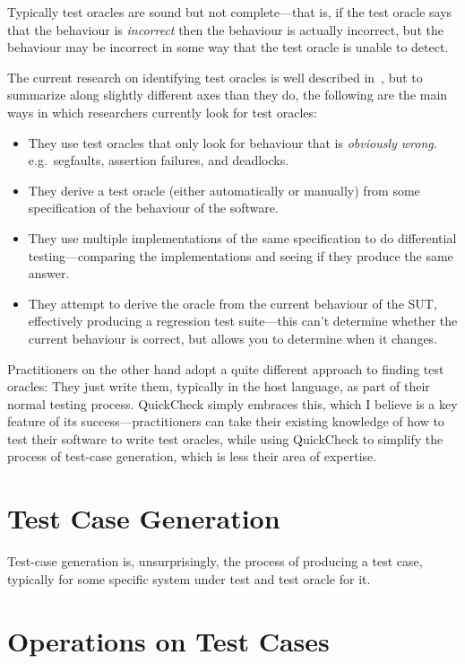 Typically test oracles are sound but not complete---that is,
if the test oracle says that the behaviour is \emph{incorrect} then the behaviour is actually incorrect,
but the behaviour may be incorrect in some way that the test oracle is unable to detect.

The current research on identifying test oracles is well described in~\cite{DBLP:journals/tse/BarrHMSY15},
but to summarize along slightly different axes than they do,
the following are the main ways in which researchers currently look for test oracles:

\begin{itemize}
\item They use test oracles that only look for behaviour that is \emph{obviously wrong}.
e.g.\ segfaults, assertion failures, and deadlocks.
\item They derive a test oracle (either automatically or manually) from some specification of the behaviour of the software.
\item They use multiple implementations of the same specification to do differential testing---comparing
the implementations and seeing if they produce the same answer.
\item They attempt to derive the oracle from the current behaviour of the SUT,
effectively producing a regression test suite---this
can't determine whether the current behaviour is correct,
but allows you to determine when it changes.
\end{itemize}

Practitioners on the other hand adopt a quite different approach to finding test oracles:
They just write them,
typically in the host language,
as part of their normal testing process.
QuickCheck simply embraces this,
which I believe is a key feature of its success---practitioners
can take their existing knowledge of how to test their software to write test oracles,
while using QuickCheck to simplify the process of test-case generation,
which is less their area of expertise.

\chapter{Test Case Generation}\label{chap:generation}

Test-case generation is,
unsurprisingly,
the process of producing a test case,
typically for some specific system under test and test oracle for it.

\chapter{Operations on Test Cases}

